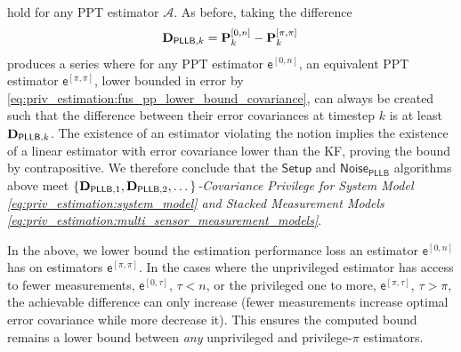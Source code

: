 hold for any PPT estimator $\mathcal{A}$. As before, taking the difference 
\begin{equation}\label{eq:priv_estimation:fus_unpriv_priv_pllb_difference_series}
  {\ensuremath{{\mathbf{D}}}}_{\mathsf{PLLB},k} = {{\mathbf{P}}}_k^{[0,n]} - {{\mathbf{P}}}_k^{[\pi,\pi]}\,
\end{equation}
produces a series where for any PPT estimator $\mathsf{e}^{[0,n]}$, an equivalent PPT estimator $\mathsf{e}^{[\pi,\pi]}$, lower bounded in error by \eqref{eq:priv_estimation:fus_pp_lower_bound_covariance}, can always be created such that the difference between their error covariances at timestep $k$ is at least ${{\mathbf{D}}}_{\mathsf{PLLB},k}$. The existence of an estimator violating the notion implies the existence of a linear estimator with error covariance lower than the KF, proving the bound by contrapositive. We therefore conclude that the $\mathsf{Setup}$ and $\mathsf{Noise_{\mathsf{PLLB}}}$ algorithms above meet \textit{$\{{{\mathbf{D}}}_{\mathsf{PLLB},1},{{\mathbf{D}}}_{\mathsf{PLLB},2},\dots\}$-Covariance Privilege for System Model \ref{eq:priv_estimation:system_model} and Stacked Measurement Models \ref{eq:priv_estimation:multi_sensor_measurement_models}}.

In the above, we lower bound the estimation performance loss an estimator $\mathsf{e}^{[0,n]}$ has on estimators $\mathsf{e}^{[\pi,\pi]}$. In the cases where the unprivileged estimator has access to fewer measurements, $\mathsf{e}^{[0,\tau]}$, $\tau<n$, or the privileged one to more, $\mathsf{e}^{[\pi,\tau]}$, $\tau>\pi$, the achievable difference can only increase (fewer measurements increase optimal error covariance while more decrease it). This ensures the computed bound remains a lower bound between \textit{any} unprivileged and privilege-$\pi$ estimators.

% 
% 

